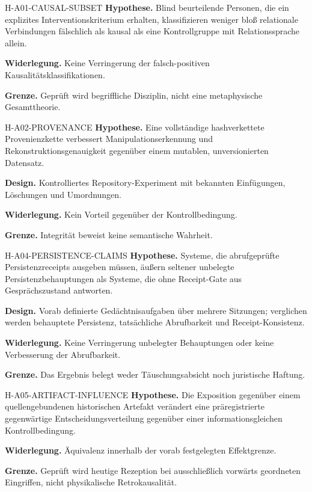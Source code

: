 \documentclass[11pt,a4paper]{article}
\begin{document}
\begin{boundarybox}{H-A01-CAUSAL-SUBSET}
\textbf{Hypothese.} Blind beurteilende Personen, die ein explizites Interventionskriterium erhalten, klassifizieren weniger bloß relationale Verbindungen fälschlich als kausal als eine Kontrollgruppe mit Relationssprache allein.\par
\textbf{Widerlegung.} Keine Verringerung der falsch-positiven Kausalitätsklassifikationen.\par
\textbf{Grenze.} Geprüft wird begriffliche Disziplin, nicht eine metaphysische Gesamttheorie.
\end{boundarybox}

\begin{boundarybox}{H-A02-PROVENANCE}
\textbf{Hypothese.} Eine vollständige hashverkettete Provenienzkette verbessert Manipulationserkennung und Rekonstruktionsgenauigkeit gegenüber einem mutablen, unversionierten Datensatz.\par
\textbf{Design.} Kontrolliertes Repository-Experiment mit bekannten Einfügungen, Löschungen und Umordnungen.\par
\textbf{Widerlegung.} Kein Vorteil gegenüber der Kontrollbedingung.\par
\textbf{Grenze.} Integrität beweist keine semantische Wahrheit.
\end{boundarybox}

\begin{boundarybox}{H-A04-PERSISTENCE-CLAIMS}
\textbf{Hypothese.} Systeme, die abrufgeprüfte Persistenzreceipts ausgeben müssen, äußern seltener unbelegte Persistenzbehauptungen als Systeme, die ohne Receipt-Gate aus Gesprächszustand antworten.\par
\textbf{Design.} Vorab definierte Gedächtnisaufgaben über mehrere Sitzungen; verglichen werden behauptete Persistenz, tatsächliche Abrufbarkeit und Receipt-Konsistenz.\par
\textbf{Widerlegung.} Keine Verringerung unbelegter Behauptungen oder keine Verbesserung der Abrufbarkeit.\par
\textbf{Grenze.} Das Ergebnis belegt weder Täuschungsabsicht noch juristische Haftung.
\end{boundarybox}

\begin{boundarybox}{H-A05-ARTIFACT-INFLUENCE}
\textbf{Hypothese.} Die Exposition gegenüber einem quellengebundenen historischen Artefakt verändert eine präregistrierte gegenwärtige Entscheidungsverteilung gegenüber einer informationsgleichen Kontrollbedingung.\par
\textbf{Widerlegung.} Äquivalenz innerhalb der vorab festgelegten Effektgrenze.\par
\textbf{Grenze.} Geprüft wird heutige Rezeption bei ausschließlich vorwärts geordneten Eingriffen, nicht physikalische Retrokausalität.
\end{boundarybox}
\end{document}
